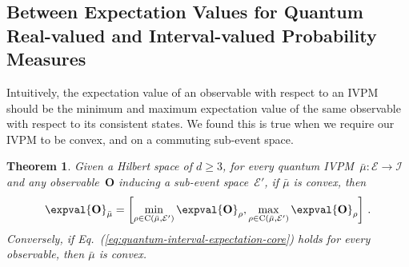 \documentclass[12pt]{iopart}
\theoremstyle{plain}
\newtheorem{thm}{Theorem}
\theoremstyle{definition}
\theoremstyle{remark}
\newcommand{\events}{\ensuremath{\mathcal{E}}}
\newcommand{\coreBorn}{\ensuremath{\mathrm{C}}}
\begin{document}
\subsection{Between Expectation Values for Quantum Real-valued and Interval-valued
Probability Measures}

Intuitively, the expectation value of an observable with respect to
an IVPM should be the minimum and maximum expectation value of the
same observable with respect to its consistent states. We found this
is true when we require our IVPM to be convex, and on a commuting
sub-event space.

\begin{thm}Given a Hilbert space of $d\ge3$, for every quantum IVPM~$\bar{\mu}:\events\rightarrow\mathscr{I}$
and any observable~$\mathbf{O}$ inducing a sub-event space~$\events'$,
if $\bar{\mu}$ is convex, then
\begin{equation}
\expval{\mathbf{O}}_{\bar{\mu}}=\left[\min_{\rho\in\coreBorn\left(\bar{\mu},\events'\right)}\expval{\mathbf{O}}_{\rho},\max_{\rho\in\coreBorn\left(\bar{\mu},\events'\right)}\expval{\mathbf{O}}_{\rho}\right]\,.\label{eq:quantum-interval-expectation-core}
\end{equation}
Conversely, if Eq.~(\ref{eq:quantum-interval-expectation-core})
holds for every observable, then $\bar{\mu}$ is convex.\end{thm}
\end{document}
